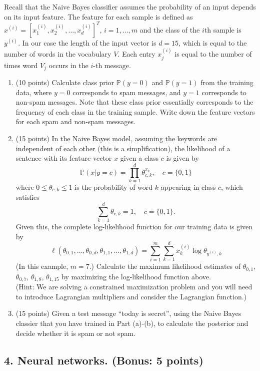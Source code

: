 \documentclass[twoside,10pt]{article}
\begin{document}
Recall that the Naive Bayes classifier assumes the probability of an input depends on its input feature. The feature for each sample is defined as
$x^{(i)} = [x_1^{(i)}, x_2^{(i)}, \ldots, x_d^{(i)}]^T$, $i = 1, \ldots, m$ and the class of the $i$th sample is $y^{(i)}$. In our case the length of the input vector is $d = 15$, which is equal to the number of words in the vocabulary $V$. Each entry $x_j^{(i)}$ is equal to the number of times word $V_j$ occurs in the $i$-th message. 

\begin{enumerate}
\item (10 points) Calculate class prior $\mathbb P(y = 0)$ and $\mathbb P(y = 1)$ from the training data, where $y = 0$ corresponds to spam messages, and $y = 1$ corresponds to non-spam messages. Note that these class prior essentially corresponds to the frequency of each class in the training sample. Write down the feature vectors for each spam and non-spam messages.
\item (15 points) In the Naive Bayes model, assuming the keywords are independent of each other (this is a simplification), the likelihood of a sentence with its feature vector $x$ given a class $c$ is given by 
\[
\mathbb P (x|y = c) = \prod_{k=1}^d \theta_{c, k}^{x_k}, \quad c = \{0, 1\}
\]
where $0 \leq \theta_{c,k} \leq 1$ is the probability of word $k$ appearing in class $c$, which satisfies 
\[\sum_{k=1}^d \theta_{c,k} = 1, \quad c = \{0, 1\}.\] Given this, the complete log-likelihood function for our training data is given by
\[
\ell(\theta_{0,1}, \ldots, \theta_{0, d}, \theta_{1,1}, \ldots, \theta_{1, d}) = 
\sum_{i=1}^m \sum_{k=1}^d x_k^{(i)} \log \theta_{y^{(i)}, k}
\]
(In this example, $m = 7$.)
 Calculate the maximum likelihood estimates of $\theta_{0,1}$, $\theta_{0,7}$, $\theta_{1,8}$, $\theta_{1,15}$ by maximizing the log-likelihood function above.\\
 (Hint: We are solving a constrained maximization problem and you will need to introduce Lagrangian multipliers and consider the Lagrangian function.)
\item (15 points) Given a test message ``\textsf{today is secret}'', using the Naive Bayes classier that you have trained in Part (a)-(b), to calculate the posterior and decide whether it is spam or not spam.

\end{enumerate}



\subsection*{\bf 4. Neural networks. (Bonus: 5 points)}
\end{document}
